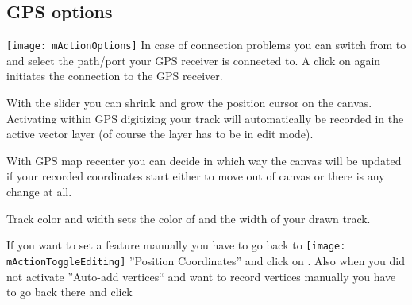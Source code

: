 \subsection{GPS options}
\texttt{[image: mActionOptions]} In case of connection
problems you can switch from  to  and select the path/port your GPS receiver is connected to.
A click on  again initiates the connection to the GPS
receiver.

With the slider  you can shrink and grow the position
cursor on the canvas. Activating  within GPS
digitizing your track will automatically be recorded in the active vector layer
(of course the layer has to be in edit mode).

With GPS map recenter you can decide in which way the canvas will be
updated if your recorded coordinates start either to move out of canvas
or there is any change at all.

Track color and width sets the color of and the width of your drawn track.

If you want to set a feature manually you have to go back to
\texttt{[image: mActionToggleEditing]} ''Position Coordinates''
and click on . Also when you did not activate ''Auto-add vertices``
and want to record vertices manually you have to go back there and
click 

\FloatBarrier
